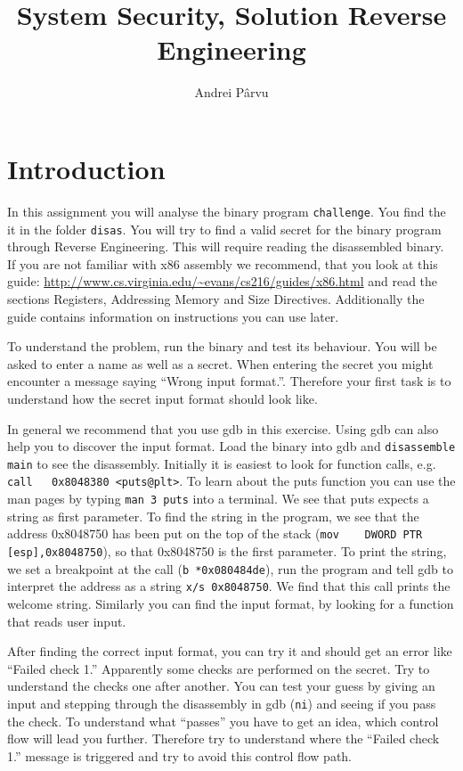 \documentclass[a4paper,11pt]{article}
\title{System Security,
\ifsolution Solution \else \fi
Reverse Engineering}
\author{Andrei Pârvu}
\begin{document}
\maketitle


\section*{Introduction}

In this assignment you will analyse the binary program {\tt challenge}.  You
find the it in the folder \texttt{disas}.  You will try to find a valid secret
for the binary program through Reverse Engineering. This will require reading
the disassembled binary. If you are not familiar with x86 assembly we recommend,
that you look at this guide:
\url{http://www.cs.virginia.edu/~evans/cs216/guides/x86.html} and read the
sections Registers, Addressing Memory and Size Directives. Additionally the
guide contains information on instructions you can use later.

To understand the problem, run the binary and test its behaviour. You will be
asked to enter a name as well as a secret. When entering the secret you might
encounter a message saying ``Wrong input format.''. Therefore your first task is
to understand how the secret input format should look like.

In general we recommend that you use gdb in this exercise. Using gdb can also
help you to discover the input format. Load the binary into gdb and
\verb|disassemble main| to see the disassembly. Initially it is easiest to look
for function calls, e.g. \verb|call   0x8048380 <puts@plt>|. To learn about the
puts function you can use the man pages by typing \verb|man 3 puts| into a
terminal. We see that puts expects a string as first parameter. To find the
string in the program, we see that the address 0x8048750 has been put on the top
of the stack (\verb|mov    DWORD PTR [esp],0x8048750|), so that 0x8048750 is the
first parameter. To print the string, we set a breakpoint at the call 
(\verb|b *0x080484de|), 
run the program and tell gdb to interpret the address as a string
\verb|x/s 0x8048750|. We find that this call prints the welcome string.
Similarly you can find the input format, by looking for a function that reads
user input.

After finding the correct input format, you can try it and should get an error
like ``Failed check 1.'' Apparently some checks are performed on the secret.
Try to understand the checks one after another. You can test your guess by
giving an input and stepping through the disassembly in gdb (\verb|ni|) and
seeing if you pass the check. To understand what ``passes'' you have to get an
idea, which control flow will lead you further. Therefore try to understand
where the ``Failed check 1.'' message is triggered and try to avoid this control
flow path.
\end{document}
